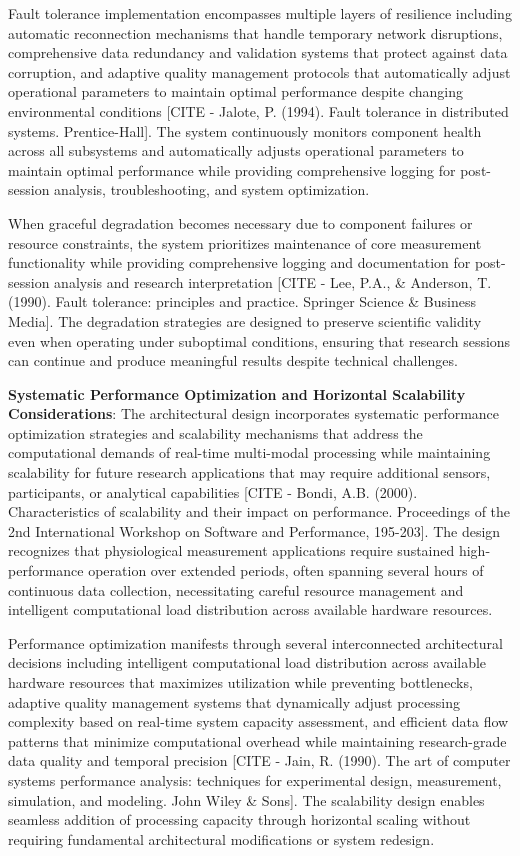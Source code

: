 \documentclass[12pt,a4paper]{report}
\begin{document}
Fault tolerance implementation encompasses multiple layers of resilience including automatic reconnection mechanisms
that handle temporary network disruptions, comprehensive data redundancy and validation systems that protect against
data corruption, and adaptive quality management protocols that automatically adjust operational parameters to maintain
optimal performance despite changing environmental
conditions [CITE - Jalote, P. (1994). Fault tolerance in distributed systems. Prentice-Hall]. The system continuously
monitors component health across all subsystems and automatically adjusts operational parameters to maintain optimal
performance while providing comprehensive logging for post-session analysis, troubleshooting, and system optimization.

When graceful degradation becomes necessary due to component failures or resource constraints, the system prioritizes
maintenance of core measurement functionality while providing comprehensive logging and documentation for post-session
analysis and research
interpretation [CITE - Lee, P.A., \& Anderson, T. (1990). Fault tolerance: principles and practice. Springer Science \& Business Media].
The degradation strategies are designed to preserve scientific validity even when operating under suboptimal conditions,
ensuring that research sessions can continue and produce meaningful results despite technical challenges.

\textbf{Systematic Performance Optimization and Horizontal Scalability Considerations}: The architectural design incorporates
systematic performance optimization strategies and scalability mechanisms that address the computational demands of
real-time multi-modal processing while maintaining scalability for future research applications that may require
additional sensors, participants, or analytical
capabilities [CITE - Bondi, A.B. (2000). Characteristics of scalability and their impact on performance. Proceedings of the 2nd International Workshop on Software and Performance, 195-203].
The design recognizes that physiological measurement applications require sustained high-performance operation over
extended periods, often spanning several hours of continuous data collection, necessitating careful resource management
and intelligent computational load distribution across available hardware resources.

Performance optimization manifests through several interconnected architectural decisions including intelligent
computational load distribution across available hardware resources that maximizes utilization while preventing
bottlenecks, adaptive quality management systems that dynamically adjust processing complexity based on real-time system
capacity assessment, and efficient data flow patterns that minimize computational overhead while maintaining
research-grade data quality and temporal
precision [CITE - Jain, R. (1990). The art of computer systems performance analysis: techniques for experimental design, measurement, simulation, and modeling. John Wiley \& Sons].
The scalability design enables seamless addition of processing capacity through horizontal scaling without requiring
fundamental architectural modifications or system redesign.
\end{document}
